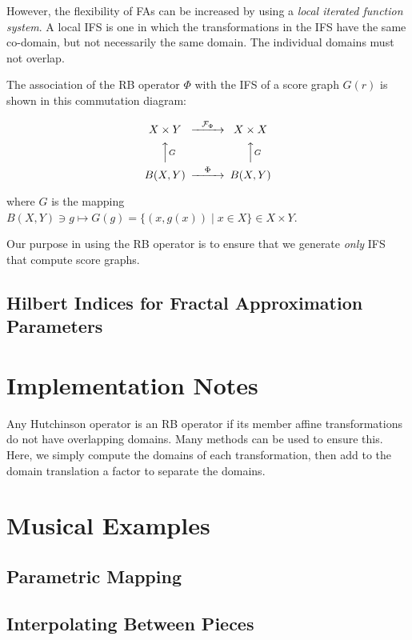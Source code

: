 \documentclass[english,11pt,letterpaper,onecolumn]{scrartcl}
\numberwithin{equation}{section}
\newcommand{\cF}{\mathcal{F}}
\newcommand{\be}{\begin{equation}}
\newcommand{\ee}{\end{equation}}
\begin{document}

However, the flexibility of FAs can be increased by using a 
\textit{local iterated function system}. A local IFS is one in which the 
transformations in the IFS have the same co-domain, but not necessarily the 
same domain. The individual domains must not overlap.

The association of the RB operator $\Phi$ with the IFS of a score graph $G(r)$ is 
shown in this commutation diagram:

\be
\begin{CD}
	X\times Y @>\cF_\Phi>> X\times X\\
	@AAGA                  @AAGA\\
	B(X,Y) @>\Phi>>  B(X,Y)
\end{CD}
\ee

\noindent where $G$ is the mapping $B(X,Y)\ni g\longmapsto G(g) = \{(x, g(x))\mid x\in X\}\in X\times Y$.

Our purpose in using the RB operator is to ensure that we generate \textit{only} IFS 
that compute score graphs.

    \subsection{Hilbert Indices for Fractal Approximation Parameters}
    
    \section{Implementation Notes}
    
Any Hutchinson operator is an RB operator if its member affine transformations do not have overlapping domains. 
Many methods can be used to ensure this. Here, we simply compute the domains of each transformation, then add to the 
domain translation a factor to separate the domains.
    
    \section{Musical Examples}
    
    \subsection{Parametric Mapping}
    
    
    \subsection{Interpolating Between Pieces}
    
\end{document}

